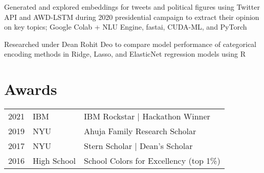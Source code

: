 \documentclass[]{deedy-resume-openfont}
\begin{document}
\begin{minipage}[t]{0.66\textwidth}
Generated and explored embeddings for tweets and political figures using Twitter API and AWD-LSTM during 2020 presidential campaign to extract their opinion on key topics;
Google Colab + NLU Engine, fastai, CUDA-ML, and PyTorch
\sectionsep

Researched under Dean Rohit Deo to compare model performance of categorical encoding methods in Ridge, Lasso, and ElasticNet regression models using R
\sectionsep


\section{Awards} 
\begin{tabular}{rll}
2021	 & IBM & IBM Rockstar | Hackathon Winner \\
2019	 & NYU & Ahuja Family Research Scholar \\
2017     & NYU & Stern Scholar | Dean's Scholar \\
2016     & High School & School Colors for Excellency (top 1\%) \\
\end{tabular}
\sectionsep


% 
% 

\end{minipage} 
\end{document}

